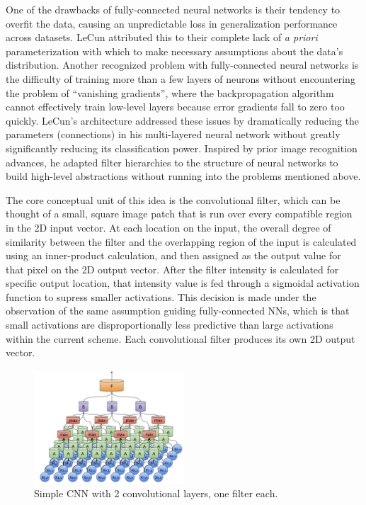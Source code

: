 \documentclass[midd]{thesis}
\begin{document}
One of the drawbacks of fully-connected neural networks is their tendency to overfit the data, causing an unpredictable loss in generalization performance across datasets. LeCun attributed this to their complete lack of \emph{a priori} parameterization with which to make necessary assumptions about the data's distribution. Another recognized problem with fully-connected neural networks is the difficulty of training more than a few layers of neurons without encountering the problem of ``vanishing gradients'', where the backpropagation algorithm cannot effectively train low-level layers because error gradients fall to zero too quickly. 
LeCun's architecture addressed these issues by dramatically reducing the parameters (connections) in his multi-layered neural network without greatly significantly reducing its classification power. Inspired by prior image recognition advances, he adapted filter hierarchies to the structure of neural networks to build high-level abstractions without running into the problems mentioned above. 

The core conceptual unit of this idea is the convolutional filter, which can be thought of a small, square image patch that is run over every compatible region in the 2D input vector. At each location on the input, the overall degree of similarity between the filter and the overlapping region of the input is calculated using an inner-product calculation, and then assigned as the output value for that pixel on the 2D output vector. After the filter intensity is calculated for specific output location, that intensity value is fed through a sigmoidal activation function to supress smaller activations. This decision is made under the observation of the same assumption guiding fully-connected NNs, which is that small activations are disproportionally less predictive than large activations within the current scheme. Each convolutional filter produces its own 2D output vector. 

\begin{figure}[t]
\centering
\includegraphics[width=0.5\textwidth]{visualizations/simple-cnn.png}
\caption{Simple CNN with 2 convolutional layers, one filter each.}
\label{fig:cnn-in-neurons}
\end{figure}
\end{document}
